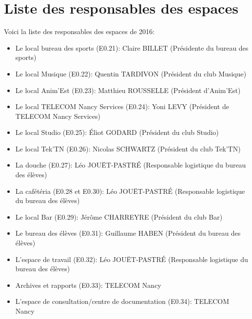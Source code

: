 \documentclass{article} %
\begin{document}
	\section*{Liste des responsables des espaces}

		Voici la liste des responsables des espaces de 2016:
		\begin{itemize}
			\item Le local bureau des sports (E0.21): Claire BILLET (Présidente
				du bureau des sports)
			\item Le local Musique (E0.22): Quentin TARDIVON (Président du club
				Musique)
			\item Le local Anim’Est (E0.23): Matthieu ROUSSELLE (Président
				d’Anim’Est)
			\item Le local TELECOM Nancy Services (E0.24): Yoni LEVY (Président
				de TELECOM Nancy Services)
			\item Le local Studio (E0.25): Éliot GODARD (Président du club
				Studio)
			\item Le local Tek’TN (E0.26): Nicolas SCHWARTZ (Président du club
				Tek’TN)
			\item La douche (E0.27): Léo JOUËT-PASTRÉ (Responsable logistique du
				bureau des élèves)
			\item La cafétéria (E0.28 et E0.30): Léo JOUËT-PASTRÉ (Responsable
				logistique du bureau des élèves)
			\item Le local Bar (E0.29): Jérôme CHARREYRE (Président du club Bar)
			\item Le bureau des élèves (E0.31): Guillaume HABEN (Président du
				bureau des élèves)
			\item L’espace de travail (E0.32): Léo JOUËT-PASTRÉ (Responsable
				logistique du bureau des élèves)
			\item Archives et rapports (E0.33): TELECOM Nancy
			\item L'espace de consultation/centre de documentation (E0.34):
				TELECOM Nancy
		\end{itemize}
\end{document}
